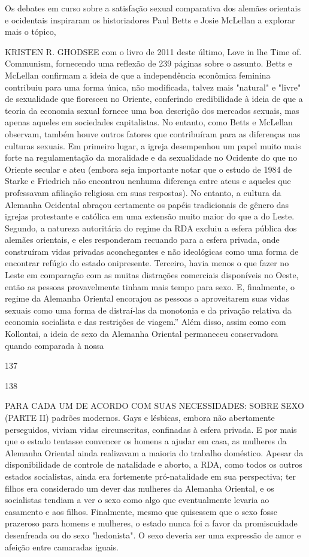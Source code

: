  \par 
Os debates em curso sobre a satisfação sexual comparativa dos alemães orientais e ocidentais inspiraram os historiadores Paul Betts e Josie McLellan a explorar mais o tópico,
 \par 
KRISTEN R. GHODSEE com o livro de 2011 deste último, Love in lhe Time of. Communism, fornecendo uma reflexão de {\color{blue}239} páginas sobre o assunto. Betts e McLellan confirmam a ideia de que a independência econômica feminina contribuiu para uma forma única, não modificada, talvez mais "natural" e "livre" de sexualidade que floresceu no Oriente, conferindo credibilidade à ideia de que a teoria da economia sexual fornece uma boa descrição dos mercados sexuais, mas apenas aqueles em sociedades capitalistas. No entanto, como Betts e McLellan observam, também houve outros fatores que contribuíram para as diferenças nas culturas sexuais. Em primeiro lugar, a igreja desempenhou um papel muito mais forte na regulamentação da moralidade e da sexualidade no Ocidente do que no Oriente secular e ateu (embora seja importante notar que o estudo de 1984 de Starke e Friedrich não encontrou nenhuma diferença entre ateus e aqueles que professavam afiliação religiosa em suas respostas). No entanto, a cultura da Alemanha Ocidental abraçou certamente os papéis tradicionais de gênero das igrejas protestante e católica em uma extensão muito maior do que a do Leste. Segundo, a natureza autoritária do regime da RDA excluiu a esfera pública dos alemães orientais, e eles responderam recuando para a esfera privada, onde construíram vidas privadas aconchegantes e não ideológicas como uma forma de encontrar refúgio do estado onipresente. Terceiro, havia menos o que fazer no Leste em comparação com as muitas distrações comerciais disponíveis no Oeste, então as pessoas provavelmente tinham mais tempo para sexo. E, finalmente, o regime da Alemanha Oriental encorajou as pessoas a aproveitarem suas vidas sexuais como uma forma de distraí-las da monotonia e da privação relativa da economia socialista e das restrições de viagem.” Além disso, assim como com Kollontai, a ideia de sexo da Alemanha Oriental permaneceu conservadora quando comparada à nossa
 \par 
137
 \par 
138
 \par 
PARA CADA UM DE ACORDO COM SUAS NECESSIDADES: SOBRE SEXO (PARTE II) padrões modernos. Gays e lésbicas, embora não abertamente perseguidos, viviam vidas circunscritas, confinadas à esfera privada. E por mais que o estado tentasse convencer os homens a ajudar em casa, as mulheres da Alemanha Oriental ainda realizavam a maioria do trabalho doméstico. Apesar da disponibilidade de controle de natalidade e aborto, a RDA, como todos os outros estados socialistas, ainda era fortemente pró-natalidade em sua perspectiva; ter filhos era considerado um dever das mulheres da Alemanha Oriental, e os socialistas tendiam a ver o sexo como algo que eventualmente levaria ao casamento e aos filhos. Finalmente, mesmo que quisessem que o sexo fosse prazeroso para homens e mulheres, o estado nunca foi a favor da promiscuidade desenfreada ou do sexo "hedonista". O sexo deveria ser uma expressão de amor e afeição entre camaradas iguais.
